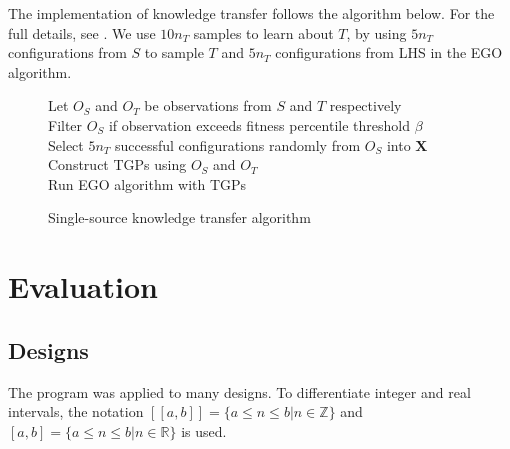 \documentclass[10pt,a4paper]{article}
\newcommand{\dsb}[1]{[\![#1]\!]}
\begin{document}
The implementation of knowledge transfer follows the algorithm below. For the full details, see . We use $10n_T$ samples to learn about $T$, by using $5n_T$ configurations from $S$ to sample $T$ and $5n_T$ configurations from LHS in the EGO algorithm. 
\begin{figure}[H]
	\begin{framed}
		\begin{algorithm}[H]
			Let $O_S$ and $O_T$ be observations from $S$ and $T$ respectively\\
			Filter $O_S$ if observation exceeds fitness percentile threshold $\beta$\\
			Select $5n_T$ successful configurations randomly from $O_S$ into $\mathbf{X}$\\
			Construct TGPs using $O_S$ and $O_T$\\
			Run EGO algorithm with TGPs
		\end{algorithm}		
	\end{framed}
	\caption{Single-source knowledge transfer algorithm}
\end{figure}

\section{Evaluation}

\subsection{Designs}

The program was applied to many designs. To differentiate integer and real intervals, the notation $\dsb{a,b}=\{a\le n\le b|n\in\mathbb{Z}\}$ and $[a,b]=\{a\le n\le b|n\in\mathbb{R}\}$ is used.
\end{document}
